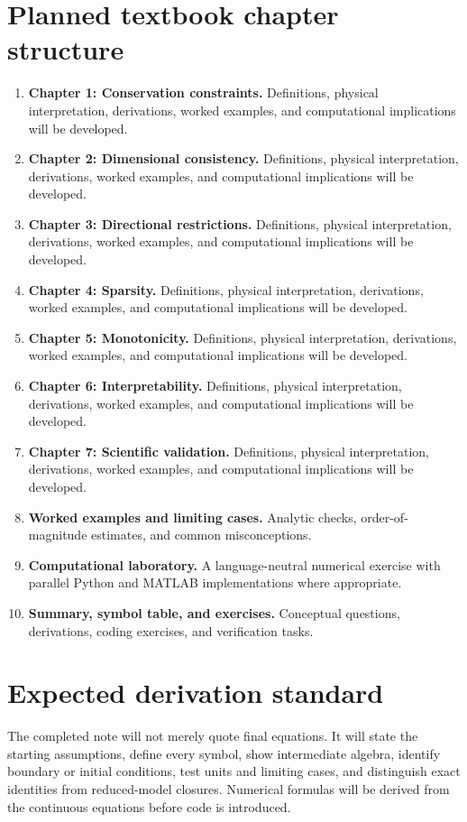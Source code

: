 \documentclass[11pt]{article}
\begin{document}
\section{Planned textbook chapter structure}
\begin{enumerate}[leftmargin=1.8em]
\item \textbf{Chapter 1: Conservation constraints.} Definitions, physical interpretation, derivations, worked examples, and computational implications will be developed.
\item \textbf{Chapter 2: Dimensional consistency.} Definitions, physical interpretation, derivations, worked examples, and computational implications will be developed.
\item \textbf{Chapter 3: Directional restrictions.} Definitions, physical interpretation, derivations, worked examples, and computational implications will be developed.
\item \textbf{Chapter 4: Sparsity.} Definitions, physical interpretation, derivations, worked examples, and computational implications will be developed.
\item \textbf{Chapter 5: Monotonicity.} Definitions, physical interpretation, derivations, worked examples, and computational implications will be developed.
\item \textbf{Chapter 6: Interpretability.} Definitions, physical interpretation, derivations, worked examples, and computational implications will be developed.
\item \textbf{Chapter 7: Scientific validation.} Definitions, physical interpretation, derivations, worked examples, and computational implications will be developed.
\item \textbf{Worked examples and limiting cases.} Analytic checks, order-of-magnitude estimates, and common misconceptions.
\item \textbf{Computational laboratory.} A language-neutral numerical exercise with parallel Python and MATLAB implementations where appropriate.
\item \textbf{Summary, symbol table, and exercises.} Conceptual questions, derivations, coding exercises, and verification tasks.
\end{enumerate}

\section{Expected derivation standard}
The completed note will not merely quote final equations. It will state the starting assumptions, define every symbol, show intermediate algebra, identify boundary or initial conditions, test units and limiting cases, and distinguish exact identities from reduced-model closures. Numerical formulas will be derived from the continuous equations before code is introduced.
\end{document}
